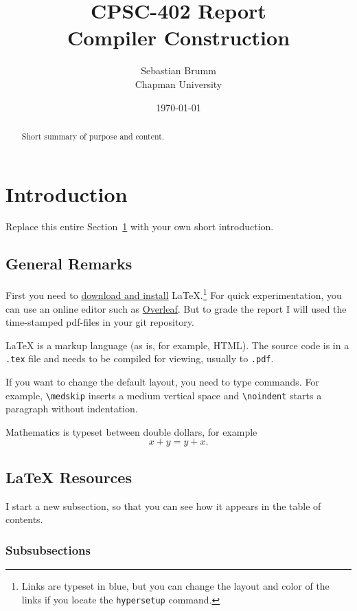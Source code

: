 \documentclass{article}
\title{CPSC-402 Report\\Compiler Construction}
\author{Sebastian Brumm  \\ Chapman University}
\date{\today}
\theoremstyle{theorem}
\theoremstyle{definition}
\theoremstyle{remark}
\begin{document}
\maketitle

\begin{abstract}
Short  summary of purpose and content.  
\end{abstract}

\tableofcontents

\section{Introduction}\label{intro}

Replace this entire Section~\ref{intro} with your own short introduction. 

\subsection{General Remarks}

First you need to \href{https://www.latex-project.org/get/}{download and install} LaTeX.\footnote{Links are typeset in blue, but you can change the layout and color of the links if you locate the  \texttt{hypersetup} command.}
%
For quick experimentation, you can use an online editor such as \href{https://www.overleaf.com/learn}{Overleaf}. But to grade the report I will used the time-stamped pdf-files in your git repository.  

 
\medskip\noindent
LaTeX is a markup language (as is, for example, HTML). The source code is in a \verb+.tex+ file and needs to be compiled for viewing, usually to \verb+.pdf+.


\medskip\noindent
If you want to change the default layout, you need to type commands. For example, \verb+\medskip+ inserts a medium vertical space and \verb+\noindent+ starts a paragraph without indentation.
 
\medskip\noindent
Mathematics is typeset between double dollars, for example $$x+y=y+x.$$


\subsection{LaTeX Resources}

I start a new subsection, so that you can see how it appears in the table of contents.

\subsubsection{Subsubsections}
\end{document}
